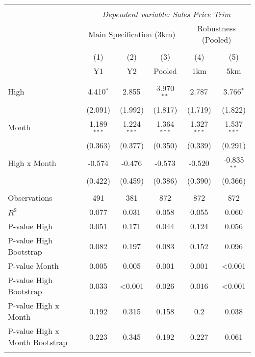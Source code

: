 
\begin{tabular}{@{\extracolsep{5pt}}lccccc}
\\[-1.8ex]\hline
\hline \\[-1.8ex]
& \multicolumn{5}{c}{\textit{Dependent variable: Sales Price Trim}} \
\cr \cline{2-6}
\\[-1.8ex] & \multicolumn{3}{c}{Main Specification (3km)} & \multicolumn{2}{c}{Robustness (Pooled)}  \\
\\[-1.8ex] & (1) & (2) & (3) & (4) & (5) 
 \\ & Y1 & Y2 & Pooled & 1km & 5km \\
\hline \\[-1.8ex]
 High & 4.410$^{*}$ & 2.855$^{}$ & 3.970$^{**}$ & 2.787$^{}$ & 3.766$^{*}$ \\
& (2.091) & (1.992) & (1.817) & (1.719) & (1.822) \\
 Month & 1.189$^{***}$ & 1.224$^{***}$ & 1.364$^{***}$ & 1.327$^{***}$ & 1.537$^{***}$ \\
& (0.363) & (0.377) & (0.350) & (0.339) & (0.291) \\
 High x Month & -0.574$^{}$ & -0.476$^{}$ & -0.573$^{}$ & -0.520$^{}$ & -0.835$^{**}$ \\
& (0.422) & (0.459) & (0.386) & (0.390) & (0.366) \\
\hline \\[-1.8ex]
 Observations & 491 & 381 & 872 & 872 & 872 \\
 $R^2$ & 0.077 & 0.031 & 0.058 & 0.055 & 0.060 \\
 P-value High & 0.051 & 0.171 & 0.044 & 0.124 & 0.056 \\
 P-value High Bootstrap & 0.082 & 0.197 & 0.083 & 0.152 & 0.096 \\
 P-value Month & 0.005 & 0.005 & 0.001 & 0.001 & <0.001 \\
 P-value High Bootstrap & 0.033 & <0.001 & 0.026 & 0.016 & <0.001 \\
 P-value High x Month & 0.192 & 0.315 & 0.158 & 0.2 & 0.038 \\
 P-value High x Month Bootstrap & 0.223 & 0.345 & 0.192 & 0.227 & 0.061 \\
\hline
\hline \\[-1.8ex]
\end{tabular}
